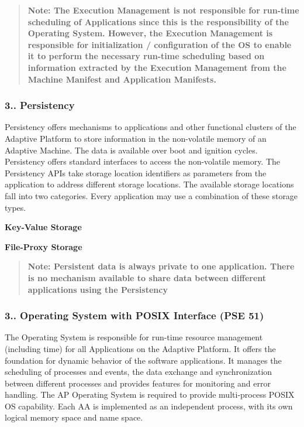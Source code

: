 \begin{quote}
{\bfseries Note\+: The Execution Management is not responsible for run-\/time scheduling of Applications since this is the responsibility of the Operating System. However, the Execution Management is responsible for initialization / configuration of the OS to enable it to perform the necessary run-\/time scheduling based on information extracted by the Execution Management from the Machine Manifest and Application Manifests.} \end{quote}


\subsubsection*{3.. Persistency}

Persistency offers mechanisms to applications and other functional clusters of the Adaptive Platform to store information in the non-\/volatile memory of an Adaptive Machine. The data is available over boot and ignition cycles. Persistency offers standard interfaces to access the non-\/volatile memory. The Persistency A\+P\+Is take storage location identifiers as parameters from the application to address different storage locations. The available storage locations fall into two categories. Every application may use a combination of these storage types.
\begin{DoxyItemize}
\item {\bfseries Key-\/\+Value Storage}
\item {\bfseries File-\/\+Proxy Storage}
\end{DoxyItemize}

\begin{quote}
{\bfseries Note\+: Persistent data is always private to one application. There is no mechanism available to share data between different applications using the Persistency} \end{quote}


\subsubsection*{3.. Operating System with P\+O\+S\+IX Interface (P\+SE 51)}

The Operating System is responsible for run-\/time resource management (including time) for all Applications on the Adaptive Platform. It offers the foundation for dynamic behavior of the software applications. It manages the scheduling of processes and events, the data exchange and synchronization between different processes and provides features for monitoring and error handling. The AP Operating System is required to provide multi-\/process P\+O\+S\+IX OS capability. Each AA is implemented as an independent process, with its own logical memory space and name space.

